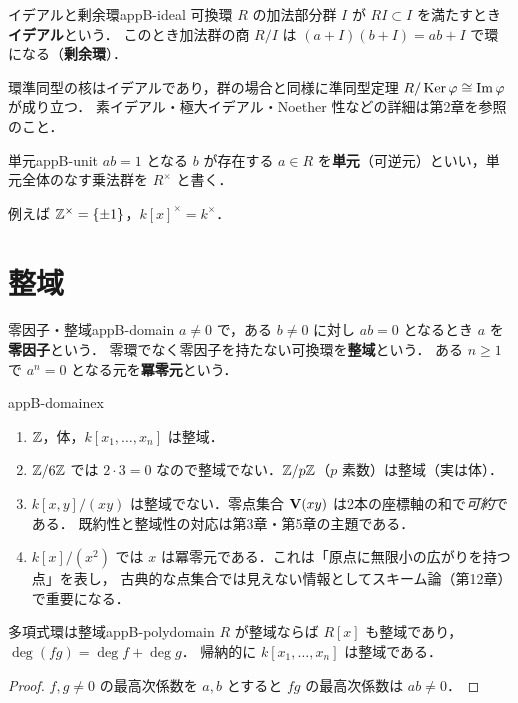 \begin{mydef}{イデアルと剰余環}{appB-ideal}
可換環 $R$ の加法部分群 $I$ が $RI\subset I$ を満たすとき\textbf{イデアル}という．
このとき加法群の商 $R/I$ は $(a+I)(b+I)=ab+I$ で環になる（\textbf{剰余環}）．
\end{mydef}

環準同型の核はイデアルであり，群の場合と同様に準同型定理 $R/\operatorname{Ker}\varphi\cong\operatorname{Im}\varphi$ が成り立つ．
素イデアル・極大イデアル・Noether 性などの詳細は第2章を参照のこと．

\begin{mydef}{単元}{appB-unit}
$ab=1$ となる $b$ が存在する $a\in R$ を\textbf{単元}（可逆元）といい，単元全体のなす乗法群を $R^\times$ と書く．
\end{mydef}

例えば $\mathbb{Z}^\times=\{\pm1\}$，$k[x]^\times=k^\times$．

\section{整域}

\begin{mydef}{零因子・整域}{appB-domain}
$a\ne0$ で，ある $b\ne0$ に対し $ab=0$ となるとき $a$ を\textbf{零因子}という．
零環でなく零因子を持たない可換環を\textbf{整域}という．
ある $n\geq1$ で $a^n=0$ となる元を\textbf{冪零元}という．
\end{mydef}

\begin{myex}{}{appB-domainex}
\begin{enumerate}
\item $\mathbb{Z}$，体，$k[x_1,\dots,x_n]$ は整域．
\item $\mathbb{Z}/6\mathbb{Z}$ では $2\cdot3=0$ なので整域でない．$\mathbb{Z}/p\mathbb{Z}$（$p$ 素数）は整域（実は体）．
\item $k[x,y]/(xy)$ は整域でない．零点集合 $\mathbf{V}(xy)$ は2本の座標軸の和で\emph{可約}である．
既約性と整域性の対応は第3章・第5章の主題である．
\item $k[x]/(x^2)$ では $x$ は冪零元である．これは「原点に無限小の広がりを持つ点」を表し，
古典的な点集合では見えない情報としてスキーム論（第12章）で重要になる．
\end{enumerate}
\end{myex}

\begin{myprop}{多項式環は整域}{appB-polydomain}
$R$ が整域ならば $R[x]$ も整域であり，$\deg(fg)=\deg f+\deg g$．
帰納的に $k[x_1,\dots,x_n]$ は整域である．
\end{myprop}
\begin{proof}
$f,g\ne0$ の最高次係数を $a,b$ とすると $fg$ の最高次係数は $ab\ne0$．
\end{proof}


